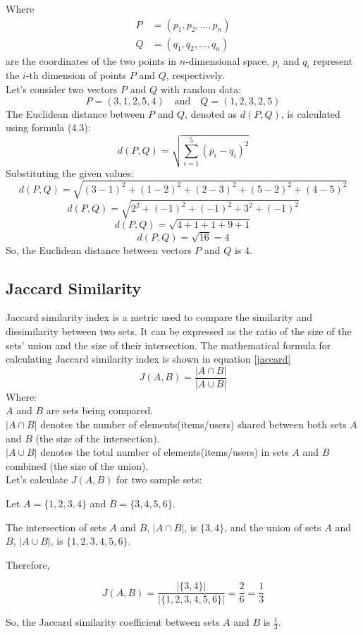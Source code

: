 Where\begin{align*}
    P & = (p_1, p_2, \ldots, p_n) \\
    Q & = (q_1, q_2, \ldots, q_n)
\end{align*}
are the coordinates of the two points in \(n\)-dimensional space. \(p_i\) and \(q_i\) represent the \(i\)-th dimension of points \(P\) and \(Q\), respectively.\\
Let's consider two vectors $P$ and $Q$ with random data:
\[
P = (3, 1, 2, 5, 4) \quad \text{and} \quad Q = (1, 2, 3, 2, 5)
\]
The Euclidean distance between $P$ and $Q$, denoted as $d(P, Q)$, is calculated using formula (4.3):
\[
d(P, Q) = \sqrt{\sum_{i=1}^{5} (p_i - q_i)^2}
\]
Substituting the given values:
\[
d(P, Q) = \sqrt{(3 - 1)^2 + (1 - 2)^2 + (2 - 3)^2 + (5 - 2)^2 + (4 - 5)^2}
\]
\[
d(P, Q) = \sqrt{2^2 + (-1)^2 + (-1)^2 + 3^2 + (-1)^2}
\]
\[
d(P, Q) = \sqrt{4 + 1 + 1 + 9 + 1}
\]
\[
d(P, Q) = \sqrt{16} = 4
\]
So, the Euclidean distance between vectors $P$ and $Q$ is $4$.


\subsection{Jaccard Similarity}
Jaccard similarity index is a metric used to compare the similarity and dissimilarity between two sets. It can be expressed as the ratio of the size of the sets' union and the size of their intersection. The mathematical formula for calculating Jaccard similarity index is shown in equation \ref{jaccard}
\begin{equation}
\label{jaccard}
J(A, B) = \frac{|A \cap B|}{|A \cup B|}
\end{equation}
Where:\\
\( A \) and \( B \) are sets being compared.\\
\( |A \cap B| \) denotes the number of elements(items/users) shared between both sets \( A \) and \( B \) (the size of the intersection).\\
\( |A \cup B| \) denotes the total number of elements(items/users) in sets \( A \) and \( B \) combined (the size of the union).\\
Let's calculate $J(A, B)$ for two sample sets:

Let $A = \{1, 2, 3, 4\}$ and $B = \{3, 4, 5, 6\}$.

The intersection of sets $A$ and $B$, $|A \cap B|$, is $\{3, 4\}$, and the union of sets $A$ and $B$, $|A \cup B|$, is $\{1, 2, 3, 4, 5, 6\}$.

Therefore,

\[
J(A, B) = \frac{|\{3, 4\}|}{|\{1, 2, 3, 4, 5, 6\}|} = \frac{2}{6} = \frac{1}{3}
\]

So, the Jaccard similarity coefficient between sets $A$ and $B$ is $\frac{1}{3}$.





